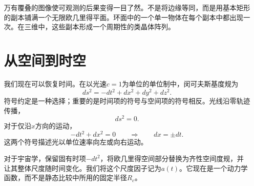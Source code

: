 万有覆叠的图像使可观测的后果变得一目了然。不是将边缘等同，而是用基本矩形的副本铺满一个无限欧几里得平面。环面中的一个单一物体在每个副本中都出现一次。在三维中，这些副本形成一个周期性的类晶体阵列。

\begin{classroomqa}
\end{classroomqa}

\begin{classroomqa}
\end{classroomqa}

\section{从空间到时空}

我们现在可以恢复时间。在以光速\(c=1\)为单位的单位制中，闵可夫斯基度规为
\begin{equation}
ds^2 = -dt^2 + dx^2 + dy^2 + dz^2.
\label{eq:c03-minkowski}
\end{equation}
符号约定是一种选择；重要的是时间项的符号与空间项的符号相反。光线沿零轨迹传播，
\begin{equation}
ds^2 = 0.
\end{equation}
对于仅沿\(x\)方向的运动，
\begin{equation}
-dt^2 + dx^2 = 0
\qquad\Rightarrow\qquad
dx = \pm dt.
\label{eq:c03-null-flat}
\end{equation}
这两个符号描述光以单位速率向左或向右运动。

对于宇宙学，保留固有时项\(-dt^2\)，将欧几里得空间部分替换为齐性空间度规，并让其整体尺度随时间变化。我们将这个尺度因子记为\(a(t)\)。它现在是一个动力学函数，而不是静态比较中所用的固定半径\(R_c\)。

